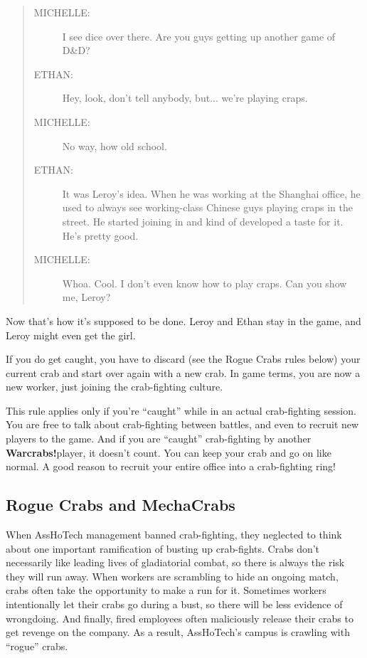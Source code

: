 \documentclass[a4paper,10pt]{article}
\newcommand{\warcrabs}{\textbf{Warcrabs!}}
\begin{document}
\begin{quote}
\begin{description}
 \item[MICHELLE:]I see dice over there. Are you guys getting up another game of D\&D?
 \item[ETHAN:]Hey, look, don't tell anybody, but... we're playing craps.
 \item[MICHELLE:]No way, how old school.
 \item[ETHAN:]It was Leroy's idea. When he was working at the Shanghai office, he used to always see working-class Chinese guys playing craps in the street. He started joining in and kind of developed a taste for it. He's pretty good.
 \item[MICHELLE:]Whoa. Cool. I don't even know how to play craps. Can you show me, Leroy?
 \end{description}
\end{quote}

Now that's how it's supposed to be done. Leroy and Ethan stay in the game, and Leroy might even get the girl.

If you do get caught, you have to discard (see the Rogue Crabs rules below) your current crab and start over again with a new crab. In game terms, you are now a new worker, just joining the crab-fighting culture.

This rule applies only if you're ``caught'' while in an actual crab-fighting session. You are free to talk about crab-fighting between battles, and even to recruit new players to the game. And if you are ``caught'' crab-fighting by another \warcrabs\hspace*{4pt}player, it doesn't count. You can keep your crab and go on like normal. A good reason to recruit your entire office into a crab-fighting ring!

\subsection*{Rogue Crabs and MechaCrabs}
\label{sec:RogueCrabsandMechaCrabs}

When AssHoTech management banned crab-fighting, they neglected to think about one important ramification of busting up crab-fights. Crabs don't necessarily like leading lives of gladiatorial combat, so there is always the risk they will run away. When workers are scrambling to hide an ongoing match, crabs often take the opportunity to make a run for it. Sometimes workers intentionally let their crabs go during a bust, so there will be less evidence of wrongdoing. And finally, fired employees often maliciously release their crabs to get revenge on the company. As a result, AssHoTech's campus is crawling with ``rogue'' crabs.
\end{document}
